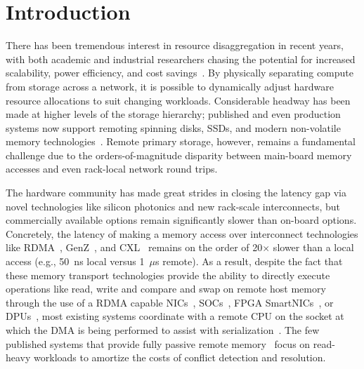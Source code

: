 \section{Introduction}

There has been tremendous interest in resource disaggregation in
recent years, with both academic and industrial researchers chasing
the potential for increased scalability, power efficiency, and cost
savings~\cite{fastswap,rethinking,the-machine,requirements,clio-arxiv,firebox,leap,zombieland,storm,aifm,legoos,supernic}.
By physically separating compute from storage across a network, it is
possible to dynamically adjust hardware resource allocations to suit
changing workloads.  Considerable headway has been made at higher
levels of the storage hierarchy; published and even production systems
now support remoting spinning disks, SSDs, and modern non-volatile
memory technologies~\cite{decible}.  Remote primary storage, however,
remains a fundamental challenge due to the orders-of-magnitude
disparity between main-board memory accesses and even rack-local
network round trips.



The hardware community has made great strides in closing the latency
gap via novel technologies like silicon photonics and new rack-scale
interconnects, but commercially available options remain significantly
slower than on-board options.  Concretely, the latency of making a
memory access over interconnect technologies
like RDMA~\cite{infiniband-spec}, GenZ~\cite{genz}, and CXL~\cite{cxl}
remains on the order of 20$\times$ slower than a local access (e.g.,
50~ns local versus 1~$\mu$s remote).  As a result, despite the fact
that these memory transport technologies provide the ability to
directly execute operations like read, write and compare and swap on
remote host memory through the use of a RDMA capable
NICs~\cite{connectx}, SOCs~\cite{cavium}, FPGA
SmartNICs~\cite{corundum,kv-direct}, or DPUs~\cite{fungible}, most
existing systems coordinate with a remote CPU on the socket at which
the DMA is being performed to assist with
serialization~\cite{cliquemap,erpc,herd,sonuma,storm}.  The few
published systems that provide fully passive remote
memory~\cite{reigons,clover} focus on read-heavy workloads to
amortize the costs of conflict detection and resolution.

